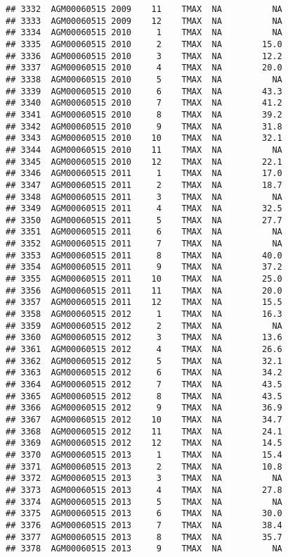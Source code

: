 \documentclass{article}\usepackage[]{graphicx}\usepackage[]{color}
\makeatletter
\newenvironment{kframe}{%
 \def\at@end@of@kframe{}%
 \ifinner\ifhmode%
  \def\at@end@of@kframe{\end{minipage}}%
  \begin{minipage}{\columnwidth}%
 \fi\fi%
 \def\FrameCommand##1{\hskip\@totalleftmargin \hskip-\fboxsep
 \colorbox{shadecolor}{##1}\hskip-\fboxsep
     \hskip-\linewidth \hskip-\@totalleftmargin \hskip\columnwidth}%
 \MakeFramed {\advance\hsize-\width
   \@totalleftmargin\z@ \linewidth\hsize
   \@setminipage}}%
 {\par\unskip\endMakeFramed%
 \at@end@of@kframe}
\newenvironment{knitrout}{}{} %
\makeatother
\begin{document}
\begin{knitrout}
\begin{kframe}
\begin{verbatim}
## 3332  AGM00060515 2009    11    TMAX  NA          NA
## 3333  AGM00060515 2009    12    TMAX  NA          NA
## 3334  AGM00060515 2010     1    TMAX  NA          NA
## 3335  AGM00060515 2010     2    TMAX  NA        15.0
## 3336  AGM00060515 2010     3    TMAX  NA        12.2
## 3337  AGM00060515 2010     4    TMAX  NA        20.0
## 3338  AGM00060515 2010     5    TMAX  NA          NA
## 3339  AGM00060515 2010     6    TMAX  NA        43.3
## 3340  AGM00060515 2010     7    TMAX  NA        41.2
## 3341  AGM00060515 2010     8    TMAX  NA        39.2
## 3342  AGM00060515 2010     9    TMAX  NA        31.8
## 3343  AGM00060515 2010    10    TMAX  NA        32.1
## 3344  AGM00060515 2010    11    TMAX  NA          NA
## 3345  AGM00060515 2010    12    TMAX  NA        22.1
## 3346  AGM00060515 2011     1    TMAX  NA        17.0
## 3347  AGM00060515 2011     2    TMAX  NA        18.7
## 3348  AGM00060515 2011     3    TMAX  NA          NA
## 3349  AGM00060515 2011     4    TMAX  NA        32.5
## 3350  AGM00060515 2011     5    TMAX  NA        27.7
## 3351  AGM00060515 2011     6    TMAX  NA          NA
## 3352  AGM00060515 2011     7    TMAX  NA          NA
## 3353  AGM00060515 2011     8    TMAX  NA        40.0
## 3354  AGM00060515 2011     9    TMAX  NA        37.2
## 3355  AGM00060515 2011    10    TMAX  NA        25.0
## 3356  AGM00060515 2011    11    TMAX  NA        20.0
## 3357  AGM00060515 2011    12    TMAX  NA        15.5
## 3358  AGM00060515 2012     1    TMAX  NA        16.3
## 3359  AGM00060515 2012     2    TMAX  NA          NA
## 3360  AGM00060515 2012     3    TMAX  NA        13.6
## 3361  AGM00060515 2012     4    TMAX  NA        26.6
## 3362  AGM00060515 2012     5    TMAX  NA        32.1
## 3363  AGM00060515 2012     6    TMAX  NA        34.2
## 3364  AGM00060515 2012     7    TMAX  NA        43.5
## 3365  AGM00060515 2012     8    TMAX  NA        43.5
## 3366  AGM00060515 2012     9    TMAX  NA        36.9
## 3367  AGM00060515 2012    10    TMAX  NA        34.7
## 3368  AGM00060515 2012    11    TMAX  NA        24.1
## 3369  AGM00060515 2012    12    TMAX  NA        14.5
## 3370  AGM00060515 2013     1    TMAX  NA        15.4
## 3371  AGM00060515 2013     2    TMAX  NA        10.8
## 3372  AGM00060515 2013     3    TMAX  NA          NA
## 3373  AGM00060515 2013     4    TMAX  NA        27.8
## 3374  AGM00060515 2013     5    TMAX  NA          NA
## 3375  AGM00060515 2013     6    TMAX  NA        30.0
## 3376  AGM00060515 2013     7    TMAX  NA        38.4
## 3377  AGM00060515 2013     8    TMAX  NA        35.7
## 3378  AGM00060515 2013     9    TMAX  NA          NA

\end{verbatim}
\end{kframe}
\end{knitrout}
\end{document}
